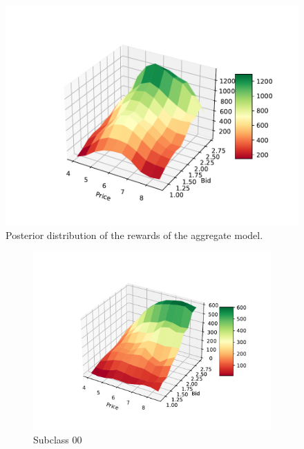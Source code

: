 \documentclass[12pt,a4paper]{report}
\begin{document}
\begin{figure}[H]
\centering
  \includegraphics[scale = 0.7, center]{7_gen}
  \caption{Posterior distribution of the rewards of the aggregate model.}
\end{figure}\begin{figure}[H]
\renewcommand*\thesubfigure{\roman{subfigure}} 
\centering
\begin{subfigure}{.49\textwidth}
  \centering
  \includegraphics[width=1\linewidth]{7_00}
  \caption{Subclass 00}
  \label{fig:sub1}
\end{subfigure}
\begin{subfigure}{.49\textwidth}
  \centering

\end{subfigure}
\end{figure}
\end{document}
